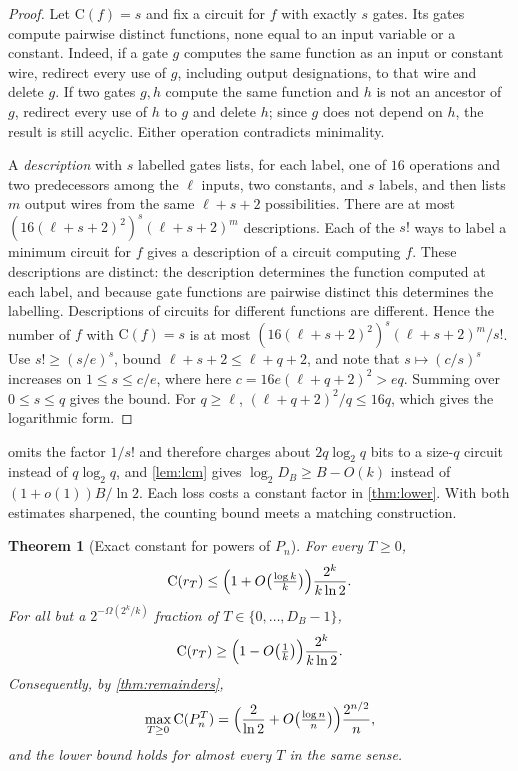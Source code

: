 \documentclass[11pt]{article}
\newtheorem{theorem}{Theorem}[section]
\theoremstyle{definition}
\theoremstyle{remark}
\newcommand{\CC}{\mathrm{C}}
\numberwithin{equation}{section}
\begin{document}
\begin{proof}
Let $\CC(f)=s$ and fix a circuit for $f$ with exactly $s$ gates.  Its gates
compute pairwise distinct functions, none equal to an input variable or a
constant.  Indeed, if a gate $g$ computes the same function as an input or
constant wire, redirect every use of $g$, including output designations,
to that wire and delete $g$.  If two gates $g,h$ compute the same
function and $h$ is not an ancestor of $g$, redirect every use of $h$ to
$g$ and delete $h$; since $g$ does not depend on $h$, the result is still
acyclic.  Either operation contradicts minimality.

A \emph{description} with $s$ labelled gates lists, for each label, one of
$16$ operations and two predecessors among the $\ell$ inputs, two
constants, and $s$ labels, and then lists $m$ output wires from the same
$\ell+s+2$ possibilities.  There are at most
$(16(\ell+s+2)^2)^s(\ell+s+2)^m$ descriptions.  Each of the $s!$ ways to
label a minimum circuit for $f$ gives a description of a circuit computing
$f$.  These descriptions are distinct: the description determines the
function computed at each label, and because gate functions are pairwise
distinct this determines the labelling.  Descriptions of circuits for
different functions are different.  Hence the number of $f$ with
$\CC(f)=s$ is at most $(16(\ell+s+2)^2)^s(\ell+s+2)^m/s!$.  Use
$s!\geq(s/e)^s$, bound $\ell+s+2\leq\ell+q+2$, and note that
$s\mapsto(c/s)^s$ increases on $1\leq s\leq c/e$, where here
$c=16e(\ell+q+2)^2>eq$.  Summing over $0\leq s\leq q$ gives the bound.
For $q\geq\ell$, $(\ell+q+2)^2/q\leq 16q$, which gives the logarithmic
form.
\end{proof}

 omits the factor $1/s!$ and therefore charges about
$2q\log_2q$ bits to a size-$q$ circuit instead of $q\log_2 q$, and
\cref{lem:lcm} gives $\log_2D_B\geq B-O(k)$ instead of $(1+o(1))B/\ln2$.
Each loss costs a constant factor in \cref{thm:lower}.  With both
estimates sharpened, the counting bound meets a matching construction.

\begin{theorem}[Exact constant for powers of $P_n$]\label{thm:exact-constant}
For every $T\geq0$,
\[
  \CC(r_T)\leq\Bigl(1+O\bigl(\tfrac{\log k}{k}\bigr)\Bigr)\frac{2^k}{k\ln2}.
\]
For all but a $2^{-\Omega(2^k/k)}$ fraction of $T\in\{0,\ldots,D_B-1\}$,
\[
  \CC(r_T)\geq\Bigl(1-O\bigl(\tfrac1k\bigr)\Bigr)\frac{2^k}{k\ln2}.
\]
Consequently, by \cref{thm:remainders},
\[
  \max_{T\geq0}\CC(P_n^T)
   =\Bigl(\frac{2}{\ln2}+O\bigl(\tfrac{\log n}{n}\bigr)\Bigr)\frac{2^{n/2}}{n},
\]
and the lower bound holds for almost every $T$ in the same sense.
\end{theorem}
\end{document}
